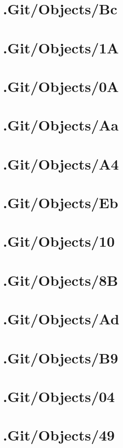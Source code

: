 \section*{.Git/Objects/Bc}

\section*{.Git/Objects/1A}

\section*{.Git/Objects/0A}

\section*{.Git/Objects/Aa}

\section*{.Git/Objects/A4}

\section*{.Git/Objects/Eb}

\section*{.Git/Objects/10}

\section*{.Git/Objects/8B}

\section*{.Git/Objects/Ad}

\section*{.Git/Objects/B9}

\section*{.Git/Objects/04}

\section*{.Git/Objects/49}


